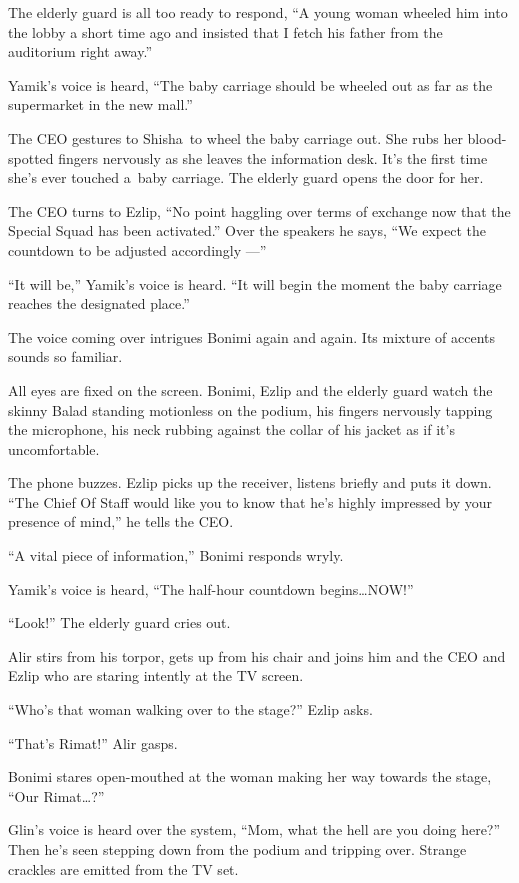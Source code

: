 \documentclass[twoside,11pt]{book}
\begin{document}
The elderly guard is all too ready to respond, ``A young{ }woman
wheeled him into the lobby a short time ago and insisted that I fetch his father from the auditorium right
away.''

Yamik's voice is heard, ``The baby carriage should be wheeled out as far as the supermarket in the new
mall.''

The CEO gestures to Shisha~to wheel the baby carriage out. She rubs her blood-spotted fingers nervously as she leaves
the information desk. It's the first time she's ever touched a~baby carriage. The elderly guard opens the door for her.

The CEO turns to Ezlip, ``No point haggling over terms of exchange now that
the Special Squad has been
activated.'' Over the speakers he says,
``We expect the countdown to be adjusted accordingly ---''

``It will be,'' Yamik's voice is heard. ``It will begin the moment the baby
carriage reaches{ }the designated place.''

The voice coming over intrigues Bonimi again and again. Its mixture of accents sounds so familiar.

All eyes are fixed on the screen.{ }Bonimi, Ezlip and the elderly guard watch
the skinny Balad standing motionless on the podium, his fingers nervously tapping the microphone, his neck rubbing
against the collar of his jacket as if it{'}s uncomfortable.

The phone buzzes. Ezlip picks up the receiver, listens briefly and puts it down. ``The Chief Of Staff would
like you to know that he's highly impressed by your presence of mind,'' he tells the CEO.

``A vital piece of information,'' Bonimi responds wryly.

Yamik's voice is heard, ``The half-hour countdown
begins{\ldots}NOW!''

``Look!'' The elderly guard cries out.

Alir stirs from his torpor, gets up from his chair and joins him and the CEO and Ezlip who are staring intently at the
TV screen.

``Who's that woman walking over to the stage?'' Ezlip asks.

``That's Rimat!'' Alir gasps.

Bonimi stares open-mouthed at the woman making her way towards the stage, ``Our
Rimat{\ldots}?''

Glin's voice is heard over the system, ``Mom, what the hell are you doing here?'' Then
he's seen stepping down from the podium and tripping over. Strange crackles
are emitted from the TV set.
\end{document}
